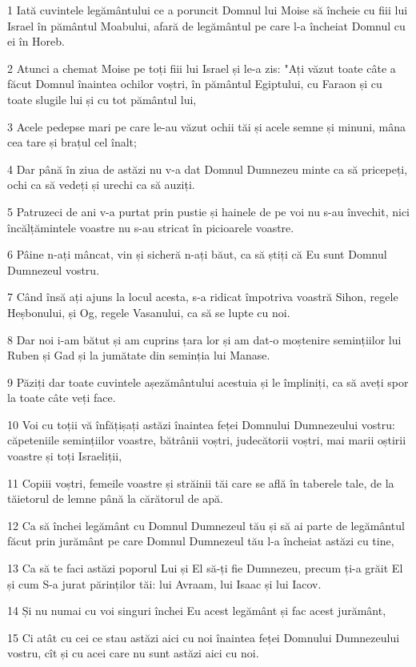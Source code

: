 \par 1 Iată cuvintele legământului ce a poruncit Domnul lui Moise să încheie cu fiii lui Israel în pământul Moabului, afară de legământul pe care l-a încheiat Domnul cu ei în Horeb.
\par 2 Atunci a chemat Moise pe toți fiii lui Israel și le-a zis: "Ați văzut toate câte a făcut Domnul înaintea ochilor voștri, în pământul Egiptului, cu Faraon și cu toate slugile lui și cu tot pământul lui,
\par 3 Acele pedepse mari pe care le-au văzut ochii tăi și acele semne și minuni, mâna cea tare și brațul cel înalt;
\par 4 Dar până în ziua de astăzi nu v-a dat Domnul Dumnezeu minte ca să pricepeți, ochi ca să vedeți și urechi ca să auziți.
\par 5 Patruzeci de ani v-a purtat prin pustie și hainele de pe voi nu s-au învechit, nici încălțămintele voastre nu s-au stricat în picioarele voastre.
\par 6 Pâine n-ați mâncat, vin și sicheră n-ați băut, ca să știți că Eu sunt Domnul Dumnezeul vostru.
\par 7 Când însă ați ajuns la locul acesta, s-a ridicat împotriva voastră Sihon, regele Heșbonului, și Og, regele Vasanului, ca să se lupte cu noi.
\par 8 Dar noi i-am bătut și am cuprins țara lor și am dat-o moștenire semințiilor lui Ruben și Gad și la jumătate din seminția lui Manase.
\par 9 Păziți dar toate cuvintele așezământului acestuia și le împliniți, ca să aveți spor la toate câte veți face.
\par 10 Voi cu toții vă înfățișați astăzi înaintea feței Domnului Dumnezeului vostru: căpeteniile semințiilor voastre, bătrânii voștri, judecătorii voștri, mai marii oștirii voastre și toți Israeliții,
\par 11 Copiii voștri, femeile voastre și străinii tăi care se află în taberele tale, de la tăietorul de lemne până la cărătorul de apă.
\par 12 Ca să închei legământ cu Domnul Dumnezeul tău și să ai parte de legământul făcut prin jurământ pe care Domnul Dumnezeul tău l-a încheiat astăzi cu tine,
\par 13 Ca să te faci astăzi poporul Lui și El să-ți fie Dumnezeu, precum ți-a grăit El și cum S-a jurat părinților tăi: lui Avraam, lui Isaac și lui Iacov.
\par 14 Și nu numai cu voi singuri închei Eu acest legământ și fac acest jurământ,
\par 15 Ci atât cu cei ce stau astăzi aici cu noi înaintea feței Domnului Dumnezeului vostru, cît și cu acei care nu sunt astăzi aici cu noi.

